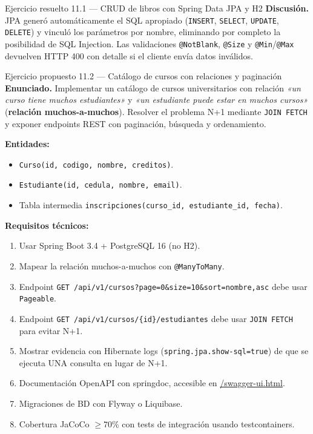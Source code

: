 \documentclass[11pt,a4paper,openany]{book}
\begin{document}
\begin{cajaejemplo}{Ejercicio resuelto 11.1 --- CRUD de libros con Spring Data JPA y H2}
\textbf{Discusión.} JPA generó automáticamente el SQL apropiado
(\texttt{INSERT}, \texttt{SELECT}, \texttt{UPDATE}, \texttt{DELETE})
y vinculó los parámetros por nombre, eliminando por completo la
posibilidad de SQL Injection. Las validaciones \texttt{@NotBlank},
\texttt{@Size} y \texttt{@Min}/\texttt{@Max} devuelven HTTP 400 con
detalle si el cliente envía datos inválidos.
\end{cajaejemplo}

\begin{cajaejercicio}{Ejercicio propuesto 11.2 --- Catálogo de cursos con relaciones y paginación}
\textbf{Enunciado.} Implementar un catálogo de cursos universitarios
con relación \emph{«un curso tiene muchos estudiantes»} y
\emph{«un estudiante puede estar en muchos cursos»} (\textbf{relación
muchos-a-muchos}). Resolver el problema N+1 mediante \texttt{JOIN
FETCH} y exponer endpoints REST con paginación, búsqueda y
ordenamiento.

\textbf{Entidades:}
\begin{itemize}
\item \texttt{Curso(id, codigo, nombre, creditos)}.
\item \texttt{Estudiante(id, cedula, nombre, email)}.
\item Tabla intermedia \texttt{inscripciones(curso\_id, estudiante\_id, fecha)}.
\end{itemize}

\textbf{Requisitos técnicos:}
\begin{enumerate}
\item Usar Spring Boot 3.4 + PostgreSQL 16 (no H2).
\item Mapear la relación muchos-a-muchos con \texttt{@ManyToMany}.
\item Endpoint \texttt{GET /api/v1/cursos?page=0\&size=10\&sort=nombre,asc}
debe usar \texttt{Pageable}.
\item Endpoint \texttt{GET /api/v1/cursos/\{id\}/estudiantes} debe
usar \texttt{JOIN FETCH} para evitar N+1.
\item Mostrar evidencia con Hibernate logs (\texttt{spring.jpa.show-sql=true})
de que se ejecuta UNA consulta en lugar de N+1.
\item Documentación OpenAPI con springdoc, accesible en
\url{/swagger-ui.html}.
\item Migraciones de BD con Flyway o Liquibase.
\item Cobertura JaCoCo $\geq 70\%$ con tests de integración usando
testcontainers.
\end{enumerate}


\end{cajaejercicio}
\end{document}
